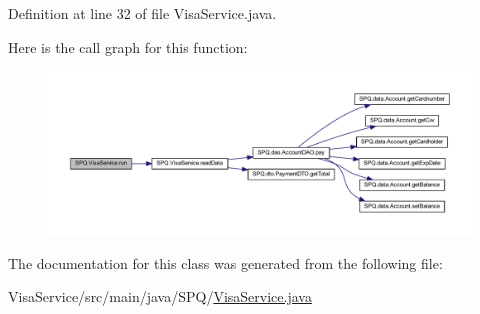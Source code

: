 Definition at line 32 of file Visa\+Service.\+java.

Here is the call graph for this function\+:
\nopagebreak
\begin{figure}[H]
\begin{center}
\leavevmode
\includegraphics[width=350pt]{class_s_p_q_1_1_visa_service_a4e9434dfb98d1ff247d29794ac96909e_cgraph}
\end{center}
\end{figure}


The documentation for this class was generated from the following file\+:\begin{DoxyCompactItemize}
\item 
Visa\+Service/src/main/java/\+S\+P\+Q/\mbox{\hyperlink{_visa_service_8java}{Visa\+Service.\+java}}\end{DoxyCompactItemize}

